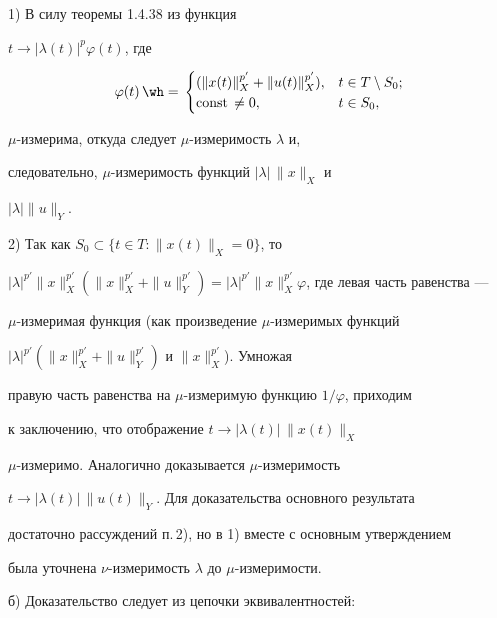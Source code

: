  


1) В силу теоремы 1.4.38 из \cite{14} функция 


$t\to|\lambda(t)|^p\varphi(t)$, где 


$$ 


\varphi(t)\hateq 


\begin{cases} 


(\|x(t)\|^{p'}_X+\|u(t)\|^{p'}_X), & t\in T\setminus S_0;\\ 


\text{const\,}\ne0, & t\in S_0, 


\end{cases} 


$$ 


$\mu$-измерима, откуда следует $\mu$-измеримость $\lambda$ и, 


следовательно, $\mu$-измеримость функций $|\lambda|\,\|x\|_X$ и 


$|\lambda|\|u\|_Y$. 


 


2) Так как $S_0\subset\{t\in T:\|x(t)\|_X=0\}$, то 


$|\lambda|^{p'}\|x\|^{p'}_X(\|x\|^{p'}_X+\|u\|^{p'}_Y)= 


|\lambda|^{p'}\|x\|^{p'}_X\varphi$, где левая часть равенства --- 


$\mu$-измеримая функция (как произведение $\mu$-измеримых функций 


$|\lambda|^{p'}(\|x\|^{p'}_X+\|u\|^{p'}_Y)$ и $\|x\|^{p'}_X$). Умножая 


правую часть равенства на $\mu$-измеримую функцию $1/\varphi$, приходим 


к заключению, что отображение $t\to|\lambda(t)|\,\|x(t)\|_X$\; 


$\mu$-измеримо. Аналогично доказывается $\mu$-измеримость 


$t\to|\lambda(t)|\,\|u(t)\|_Y$. Для доказательства основного результата 


достаточно рассуждений п.\,2), но в 1) вместе с основным утверждением 


была уточнена $\nu$-измеримость $\lambda$ до $\mu$-измеримости. 


 


б) Доказательство следует из цепочки эквивалентностей: 


